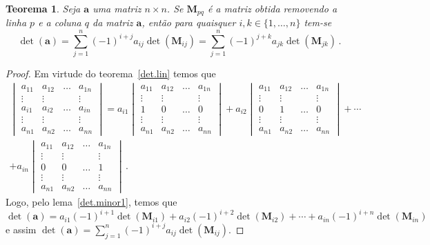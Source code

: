 \documentclass[12pt,a4paper]{report}
\newcommand{\mb}{\mathbf}
\newtheorem{thm}{Teorema}[chapter]
\begin{document}
\begin{thm}
  Seja $\mb a$ uma matriz $n\times n$. Se $\mb M_{pq}$ é a matriz obtida removendo a linha $p$ e a coluna $q$ da matriz $\mb a$, então para quaisquer $i,k\in\{1,\ldots,n\}$ tem-se
  $$\det(\mb a)=\sum_{j=1}^n(-1)^{i+j}a_{ij}\det(\mb M_{ij})=\sum_{j=1}^n(-1)^{j+k}a_{jk}\det(\mb M_{jk})\,.$$
\end{thm}
\begin{proof}
  Em virtude do teorema~\ref{det.lin} temos que
  \begin{multline*}
    \begin{vmatrix}
      a_{11}&a_{12}&\ldots&a_{1n}\\
      \vdots&\vdots&&\vdots\\
      a_{i1}&a_{i2}&\ldots&a_{in}\\
      \vdots&\vdots&&\vdots\\
      a_{n1}&a_{n2}&\ldots&a_{nn}
    \end{vmatrix}=a_{i1}\begin{vmatrix}
      a_{11}&a_{12}&\ldots&a_{1n}\\
      \vdots&\vdots&&\vdots\\
      1&0&\ldots&0\\
      \vdots&\vdots&&\vdots\\
      a_{n1}&a_{n2}&\ldots&a_{nn}
    \end{vmatrix}+a_{i2}\begin{vmatrix}
      a_{11}&a_{12}&\ldots&a_{1n}\\
      \vdots&\vdots&&\vdots\\
      0&1&\ldots&0\\
      \vdots&\vdots&&\vdots\\
      a_{n1}&a_{n2}&\ldots&a_{nn}
    \end{vmatrix}+\cdots\\
    +a_{in}\begin{vmatrix}
      a_{11}&a_{12}&\ldots&a_{1n}\\
      \vdots&\vdots&&\vdots\\
      0&0&\ldots&1\\
      \vdots&\vdots&&\vdots\\
      a_{n1}&a_{n2}&\ldots&a_{nn}
    \end{vmatrix}\,.
  \end{multline*}
  Logo, pelo lema~\ref{det.minor1}, temos que
  $$\det(\mb a)=a_{i1}(-1)^{i+1}\det(\mb M_{i1})+a_{i2}(-1)^{i+2}\det(\mb M_{i2})+\cdots+a_{in}(-1)^{i+n}\det(\mb M_{in})$$
  e assim $\det(\mb a)=\sum_{j=1}^n(-1)^{i+j}a_{ij}\det(\mb M_{ij})$.
\end{proof}
\end{document}

